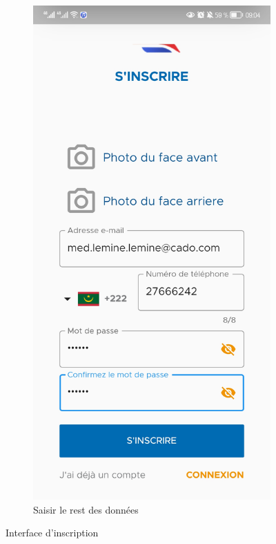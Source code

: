 \begin{itemize}[label=$\ast$]
\begin{figure}[!ht]
		\begin{subfigure}{0.3\textwidth}
			\includegraphics[width=\hsize, valign=m]{./Template LaTeX/Images/24.jpg}
			\caption{Saisir le rest des données}
			\label{fig.painel_sicapi}
		\end{subfigure}
			\caption{Interface d’inscription}
			\label{fig.sicapi}
		\end{figure}
	

\end{itemize}
